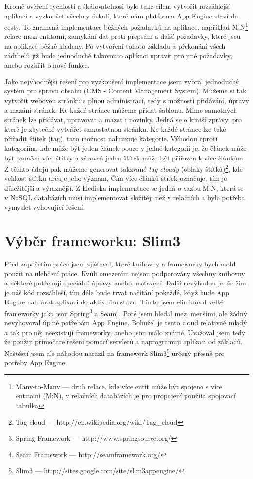 Kromě ověření rychlosti a škálovatelnosi bylo také cílem vytvořit rozsáhlejší aplikaci a vyzkoušet všechny úskalí, které nám platforma App Engine staví do cesty. To znamená implementace běžných požadavků na aplikace, například M:N\footnote{Many-to-Many --- druh relace, kde více entit může být spojeno s více entitami (M:N), v relačních databázích je pro propojení použita spojovací tabulka} relace mezi entitami, zamykání dat proti přepsání a další požadavky, které jsou na aplikace běžně kladeny. Po vytvoření tohoto základu a překonání všech zádrhelů již bude jednoduché takovouto aplikaci upravit pro jiné požadavky, anebo rozšířit o nové funkce.

Jako nejvhodnější řešení pro vyzkoušení implementace jsem vybral jednoduchý systém pro správu obsahu (CMS - Content Management System). Můžeme si tak vytvořit webovou  stránku s plnou administrací, tedy s možností přidávání, úpravy a mazání stránek. Ke každé stránce můžeme přidat šablonu. Mimo samotných stránek lze přidávat, upravovat a mazat i novinky. Jedná se o kratší zprávy, pro které je zbytečné vytvářet samostatnou stránku. Ke každé stránce lze také přiřadit štítek (tag), tato možnost nahrazuje kategorie. Výhodou oproti kategoriím, kde může být jeden článek pouze v jedné kategorii je, že článek může být označen více štítky a zároveň jeden štítek může být přiřazen k více článkům. Z těchto údajů pak můžeme generovat takzvané \emph{tag cloudy} (oblaky štítků)\footnote{Tag cloud --- http://en.wikipedia.org/wiki/Tag\_cloud}, kde velikost štítku určuje jeho význam, Čím více článků štítek označuje, tím je důležitější a výraznější. Z hlediska implementace se jedná o vazbu M:N, která se v NoSQL databázích musí implementovat složitěji než v relačních a bylo potřeba vymyslet vyhovující řešení.

\section{Výběr frameworku: Slim3}
Před započetím práce jsem zjišťoval, které knihovny a frameworky bych mohl použít na ulehčení práce. Kvůli omezením nejsou podporovány všechny knihovny a některé potřebují speciální úpravy anebo nastavení. Další nevýhodou je, že čím je náš kód rozsáhleší, tím déle bude trvat načítání pokaždé, když bude App Engine nahrávat aplikaci do aktivního stavu. Tímto jsem eliminoval velké frameworky jako jsou Spring\footnote{Spring Framework --- http://www.springsource.org/} a Seam\footnote{Seam Framework --- http://seamframework.org/}. Poté jsem hledal mezi menšími, ale žádný nevyhovoval úplně potřebám App Engine. Bohužel je tento cloud relativně mladý a tak pro něj neexistují frameworky, anebo jsou málo známé. Uvažoval jsem tedy že použiji přímočaré řešení pomocí servletů a naprogramuji aplikaci od základů. Naštěstí jsem ale náhodou narazil na framework Slim3\footnote{Slim3 --- http://sites.google.com/site/slim3appengine/} určený přesně pro potřeby App Engine.


